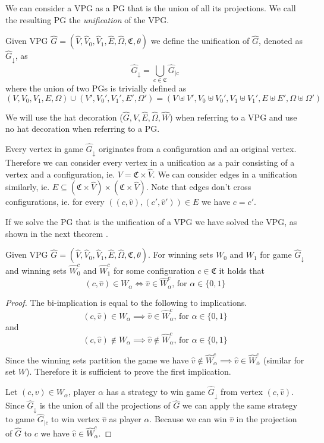 We can consider a VPG as a PG that is the union of all its projections. We call the resulting PG the \textit{unification} of the VPG.
\begin{definition}
Given VPG $\hat{G} = (\hat{V},\hat{V}_0,\hat{V}_1, \hat{E},\hat{\Omega}, \mathfrak{C},\theta)$ we define the unification of $\hat{G}$, denoted as $\hat{G}_{\downarrow}$, as
\[  \hat{G}_{\downarrow} = \bigcup_{c\in \mathfrak{C}}\hat{G}_{|c} \]
where the union of two PGs is trivially defined as
\[ (V,V_0,V_1,E,\Omega) \cup (V',V_0',V_1',E',\Omega') = (V \uplus V', V_0 \uplus V_0', V_1 \uplus V_1', E \uplus E', \Omega \uplus \Omega') \]
\end{definition}
We will use the hat decoration ($\hat{G},\hat{V},\hat{E},\hat{\Omega},\hat{W}$) when referring to a VPG and use no hat decoration when referring to a PG.

Every vertex in game $\hat{G}_{\downarrow}$ originates from a configuration and an original vertex. Therefore we can consider every vertex in a unification as a pair consisting of a vertex and a configuration, ie. $V = \mathfrak{C} \times \hat{V}$. We can consider edges in a unification similarly, ie. $E \subseteq (\mathfrak{C} \times \hat{V}) \times (\mathfrak{C} \times \hat{V})$. Note that edges don't cross configurations, ie. for every $((c,\hat{v}) , (c',\hat{v}')) \in E$ we have $c = c'$.

If we solve the PG that is the unification of a VPG we have solved the VPG, as shown in the next theorem .
\begin{theorem}
	\label{theA_solve_UVPG_is_solve_VPG}
	Given VPG $\hat{G} =  (\hat{V},\hat{V}_0,\hat{V}_1, \hat{E},\hat{\Omega}, \mathfrak{C},\theta)$. For winning sets $W_0$ and $W_1$ for game $\hat{G}_{\downarrow}$ and winning sets $\hat{W}^c_0$ and $\hat{W}^c_1$ for some configuration $c \in \mathfrak{C}$ it holds that
	\[(c,\hat{v}) \in W_\alpha \iff \hat{v} \in \hat{W}^c_\alpha  \text{, for }\alpha \in \{0,1\}  \]
	\begin{proof}
		The bi-implication is equal to  the following to implications.
		\[ (c,\hat{v}) \in W_\alpha \implies \hat{v} \in \hat{W}^c_\alpha  \text{, for }\alpha \in \{0,1\} \]
		and
		\[ (c,\hat{v}) \notin W_\alpha\implies \hat{v} \notin \hat{W}^c_\alpha \text{, for }\alpha \in \{0,1\}  \]
		
		Since the winning sets partition the game we have $\hat{v} \notin \hat{W}^c_\alpha \implies \hat{v} \in \hat{W}^c_{\overline{\alpha}}$ (similar for set $W$). Therefore it is sufficient to prove the first implication.
		
		Let $(c,\hat{v}) \in W_\alpha$, player $\alpha$ has a strategy to win game $\hat{G}_{\downarrow}$ from vertex $(c,\hat{v})$. Since $\hat{G}_{\downarrow}$ is the union of all the projections of $\hat{G}$ we can apply the same strategy to game $\hat{G}_{|c}$ to win vertex $\hat{v}$ as player $\alpha$. Because we can win $\hat{v}$ in the projection of $\hat{G}$ to $c$ we have $\hat{v} \in \hat{W}^c_\alpha$.
	\end{proof}
\end{theorem}

